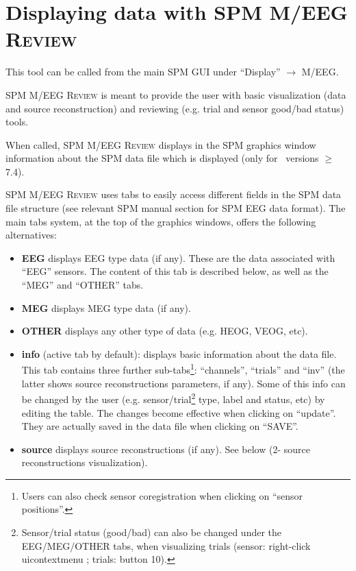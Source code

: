 \section{Displaying data with SPM M/EEG \textsc{Review}}
This tool can be called from the main SPM GUI under ``Display'' $\rightarrow$ M/EEG.

SPM M/EEG \textsc{Review} is meant to provide the user with basic visualization (data and source reconstruction) and reviewing (e.g. trial and sensor good/bad status) tools.

When called, SPM M/EEG \textsc{Review} displays in the SPM graphics window information about the SPM data file which is displayed (only for \matlab\ versions $\geq$ 7.4).

SPM M/EEG \textsc{Review} uses tabs to easily access different fields in the SPM data file structure (see relevant SPM manual section for SPM EEG data format). The main tabs system, at the top of the graphics windows, offers the following alternatives:

\begin{itemize}

\item{\textbf{EEG}} displays EEG type data (if any). These are the data associated with ``EEG'' sensors. The content of this tab is described below, as well as the ``MEG'' and ``OTHER'' tabs.

\item{\textbf{MEG}} displays MEG type data (if any).

\item{\textbf{OTHER}} displays any other type of data (e.g. HEOG, VEOG, etc).

\item{\textbf{info}}
(active tab by default): displays basic information about the data file. This tab contains three further sub-tabs\footnote{Users can also check sensor coregistration when clicking on ``sensor positions''.}: ``channels'', ``trials'' and ``inv'' (the latter shows source reconstructions parameters, if any). Some of this info can be changed by the user (e.g. sensor/trial\footnote{Sensor/trial status (good/bad) can also be changed under the EEG/MEG/OTHER tabs, when visualizing trials (sensor: right-click uicontextmenu ; trials: button 10).}  type, label and status, etc) by editing the table. The changes become effective when clicking on ``update''. They are actually saved in the data file when clicking on ``SAVE''.

\item{\textbf{source}}
displays source reconstructions (if any). See below (2- source reconstructions visualization).

\end{itemize}

